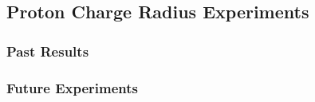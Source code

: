 \subsection{Proton Charge Radius Experiments}
\label{subsec:protonradius}

\subsubsection{Past Results}
\label{subsubsec:radiuspast}

\subsubsection{Future Experiments}
\label{subsubsec:radiusfuture}
